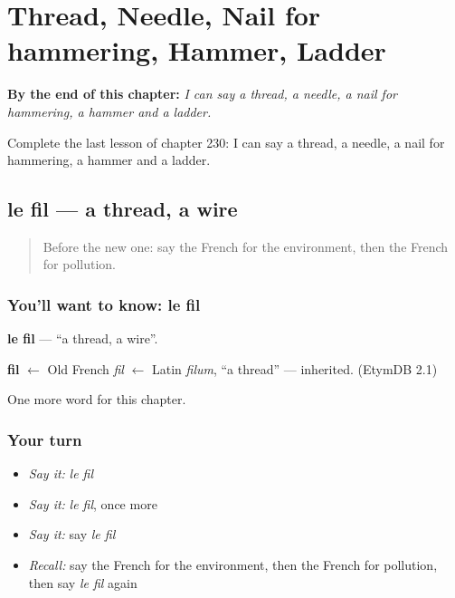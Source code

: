 
\chapter{Thread, Needle, Nail for hammering, Hammer, Ladder}
\label{ch:fr-thread-needle-nail-for-hammering-hammer-ladder}

\begin{chapteropening}
\textbf{By the end of this chapter:} \emph{I can say a thread, a needle, a nail for hammering, a hammer and a ladder.}

Complete the last lesson of chapter 230: I can say a thread, a needle, a nail for hammering, a hammer and a ladder.
\end{chapteropening}

\section[le fil]{le fil — a thread, a wire}

\label{lesson:FR-C230-fil}



\begin{quote}
Before the new one: say the French for the environment, then the French for pollution.
\end{quote}

\subsection*{You'll want to know: le fil}
\textbf{le fil} — \textquotedblleft{}a thread, a wire\textquotedblright{}.

\begin{cousinweb}
\textbf{fil} $\leftarrow$ Old French \emph{fil} $\leftarrow$ Latin \emph{filum}, \textquotedblleft{}a thread\textquotedblright{} — inherited. (EtymDB 2.1)
\end{cousinweb}

\begin{grammarlens}[title={What you've built}]
One more word for this chapter.
\end{grammarlens}

\subsection*{Your turn}
\begin{itemize}
\raggedright
  \item \emph{Say it:} \emph{le fil}
  \item \emph{Say it:} \emph{le fil}, once more
  \item \emph{Say it:} say \emph{le fil}
  \item \emph{Recall:} say the French for the environment, then the French for pollution, then say \emph{le fil} again
\end{itemize}

